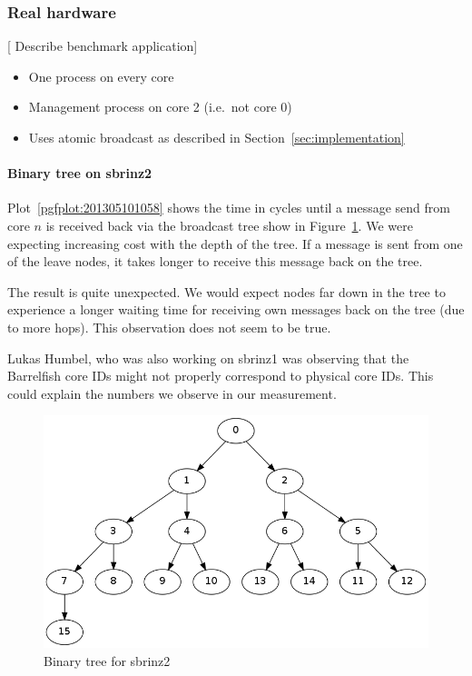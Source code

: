 \documentclass{article}
\newcommand{\stefan}[1]{
  {\color{skRed}[{\color{red}{SK}} #1]}}
\begin{document}
\subsubsection{Real hardware}

\stefan{Describe benchmark application} 
\begin{itemize}
\item One process on every core
\item Management process on core 2 (i.e.\ not core 0)
\item Uses atomic broadcast as described in Section~\ref{sec:implementation}
\end{itemize}

\paragraph{Binary tree on sbrinz2}

Plot~\ref{pgfplot:201305101058} shows the time in cycles until a
message send from core $n$ is received back via the broadcast tree
show in Figure~\ref{fig:binary_tree_sbrinz2}. We were expecting
increasing cost with the depth of the tree. If a message is sent from
one of the leave nodes, it takes longer to receive this message back
on the tree.

The result is quite unexpected. We would expect nodes far down in the
tree to experience a longer waiting time for receiving own messages
back on the tree (due to more hops). This observation does not seem to
be true. 

Lukas Humbel, who was also working on sbrinz1 was observing that the
Barrelfish core IDs might not properly correspond to physical core
IDs. This could explain the numbers we observe in our measurement.

\begin{figure}[htb]
  \centering
  \includegraphics[width=\linewidth]{binary_tree_sbrinz2}
  \caption{Binary tree for sbrinz2}
  \label{fig:binary_tree_sbrinz2}
\end{figure}
\end{document}
